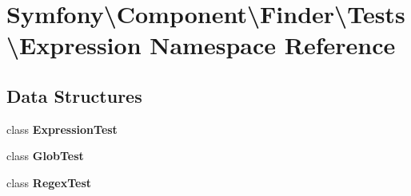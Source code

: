 \section{Symfony\textbackslash{}Component\textbackslash{}Finder\textbackslash{}Tests\textbackslash{}Expression Namespace Reference}
\label{namespace_symfony_1_1_component_1_1_finder_1_1_tests_1_1_expression}
\subsection*{Data Structures}
\begin{DoxyCompactItemize}
\item 
class {\bf Expression\+Test}
\item 
class {\bf Glob\+Test}
\item 
class {\bf Regex\+Test}
\end{DoxyCompactItemize}

